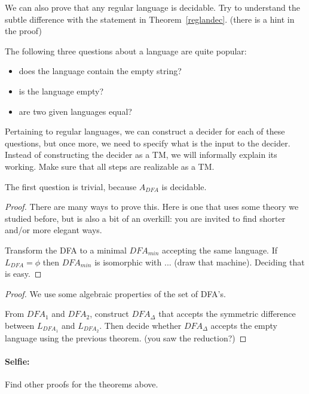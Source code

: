 We can also prove that any regular language is decidable. Try to
understand the subtle difference with the statement in
Theorem~\ref{reglandec}. (there is a hint in the proof)

The following three questions about a language are quite popular:
\begin{itemize}
\item does the language contain the empty string?
\item is the language empty?
\item are two given languages equal?
\end{itemize}

Pertaining to regular languages, we can construct a decider for each
of these questions, but once more, we need to specify what is the
input to the decider. Instead of constructing the decider as a TM, we
will informally explain its working. Make sure that all steps are
realizable as a TM.


The first question is trivial, because $A_{DFA}$ is decidable.


\begin{proof}
There are many ways to prove this. Here is one that uses some theory
we studied before, but is also a bit of an overkill: you are invited
to find shorter and/or more elegant ways.

Transform the DFA to a minimal $DFA_{min}$ accepting the same language.
If $L_{DFA} = \phi$ then $DFA_{min}$ is isomorphic with ... (draw that
machine). Deciding that is easy.
\end{proof}



\begin{proof}
We use some algebraic properties of the set of DFA's.

From $DFA_1$ and $DFA_2$, construct $DFA_\Delta$ that accepts the
symmetric difference between $L_{DFA_1}$ and $L_{DFA_2}$. Then decide
whether $DFA_\Delta$ accepts the empty language using the previous
theorem. (you saw the reduction?)
\end{proof}


\paragraph{Selfie:} Find other proofs for the theorems above.

